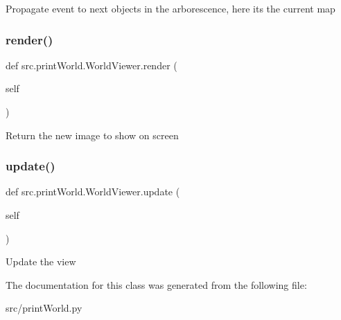 \begin{DoxyVerb}Propagate event to next objects in the arborescence, here its the
    current map \end{DoxyVerb}
 \hypertarget{classsrc_1_1print_world_1_1_world_viewer_a6a7b47cde8e50e7aee5b04b986987107}{}\label{classsrc_1_1print_world_1_1_world_viewer_a6a7b47cde8e50e7aee5b04b986987107} 
\subsubsection{\texorpdfstring{render()}{render()}}
{\footnotesize\ttfamily def src.\+print\+World.\+World\+Viewer.\+render (\begin{DoxyParamCaption}\item[{}]{self }\end{DoxyParamCaption})}

\begin{DoxyVerb}Return the new image to show on screen\end{DoxyVerb}
 \hypertarget{classsrc_1_1print_world_1_1_world_viewer_ab012a6333d30acb4979ed509337e6de6}{}\label{classsrc_1_1print_world_1_1_world_viewer_ab012a6333d30acb4979ed509337e6de6} 
\subsubsection{\texorpdfstring{update()}{update()}}
{\footnotesize\ttfamily def src.\+print\+World.\+World\+Viewer.\+update (\begin{DoxyParamCaption}\item[{}]{self }\end{DoxyParamCaption})}

\begin{DoxyVerb}Update the view \end{DoxyVerb}
 

The documentation for this class was generated from the following file\+:\begin{DoxyCompactItemize}
\item 
src/print\+World.\+py\end{DoxyCompactItemize}
